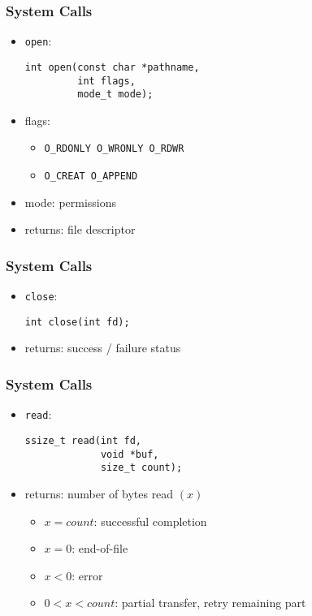 \documentclass[dvipsnames]{beamer}
\begin{document}
\begin{frame}[fragile]
  \frametitle{System Calls}

  \begin{itemize}
    \item \lstinline|open|:
    \begin{lstlisting}
int open(const char *pathname,
         int flags,
         mode_t mode);
    \end{lstlisting}

    \item flags:
    \begin{itemize}
      \item \lstinline|O_RDONLY O_WRONLY O_RDWR|
      \item \lstinline|O_CREAT O_APPEND|
    \end{itemize}

    \item mode: permissions

    \item returns: file descriptor
  \end{itemize}
\end{frame}

\begin{frame}[fragile]
  \frametitle{System Calls}

  \begin{itemize}
    \item \lstinline|close|:
    \begin{lstlisting}
int close(int fd);
    \end{lstlisting}
    \item returns: success / failure status
  \end{itemize}
\end{frame}

\begin{frame}[fragile]
  \frametitle{System Calls}

  \begin{itemize}
    \item \lstinline|read|:
    \begin{lstlisting}
ssize_t read(int fd,
             void *buf,
             size_t count);
    \end{lstlisting}
    \item returns: number of bytes read $(x)$
    \begin{itemize}
      \item $x=count$: successful completion
      \item $x=0$: end-of-file
      \item $x<0$: error
      \item $0<x<count$: partial transfer, retry remaining part
    \end{itemize}
  \end{itemize}
\end{frame}
\end{document}
